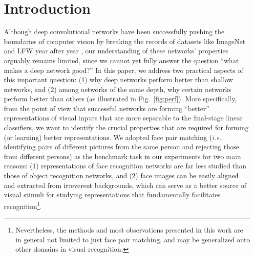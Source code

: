 \documentclass[fleqn]{article} %
\makeatletter
\DeclareRobustCommand\onedot{\futurelet\@let@token\@onedot}
\def\@onedot{\ifx\@let@token.\else.\null\fi\xspace}
\def\ie{\emph{i.e}\onedot} \def\Ie{\emph{I.e}\onedot}
\makeatother
\begin{document}
\section{Introduction}

\newcommand{\expwhyface}{Nevertheless, the methods and most observations presented in this work are in general not limited to just face pair matching, and may be generalized onto other domains in visual recognition.}

Although deep convolutional networks have been successfully pushing the boundaries of computer vision by breaking the records of datasets like ImageNet \cite{russakovsky2014imagenet} and LFW \cite{LFWTech} year after year \cite{krizhevsky2012imagenet, sermanet2013overfeat, szegedy2014going, taigman2014deepface, sun2014deep, schroff2015facenet}, our understanding of these networks' properties arguably remains limited, since we cannot yet fully answer the question ``what makes a deep network good?''
In this paper, we address two practical aspects of this important question: (1) why deep networks perform better than shallow networks, and (2) among networks of the same depth, why certain networks perform better than others (as illustrated in Fig.~\ref{fig:perf}).
More specifically, from the point of view that successful networks are forming ``better'' representations of visual inputs that are more separable to the final-stage linear classifiers, we want to identify the crucial properties that are required for forming (or learning) better representations. 
We adopted face pair matching (\ie identifying pairs of different pictures from the same person and rejecting those from different persons) as the benchmark task in our experiments for two main reasons: (1) representations of face recognition networks are far less studied than those of object recognition networks, and (2) face images can be easily aligned and extracted from irreverent backgrounds, which can serve as a better source of visual stimuli for studying representations that fundamentally facilitates recognition\footnote{\expwhyface}.

\newcommand{\expstimdim}{For simplicity, a stimulus being 2-dimensional (\ie ${\bf{x}} \in \mathbb{R}^{\sqrt{N} \times \sqrt{N}}$) or vectorized (\ie ${\bf{x}} \in \mathbb{R}^N$) are used interchangeably.}
\end{document}
